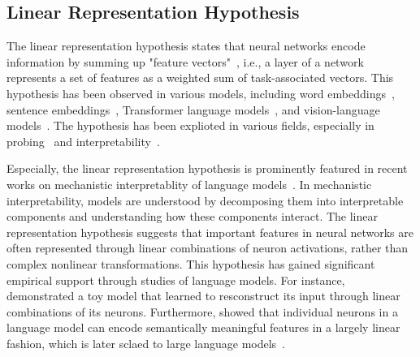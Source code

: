 \subsection{Linear Representation Hypothesis}
The linear representation hypothesis states that neural networks encode information by summing up "feature vectors"~\citep{mikolov2013linguistic,arora2016latent,olah2020zoom}, i.e., a layer of a network represents a set of features as a weighted sum of 
task-associated vectors.
This hypothesis has been observed in various models, including word embeddings~\citep{mikolov2013linguistic,conneau2017word}, sentence embeddings~\citep{bowman2015generating}, Transformer language models~\citep{meng2022locating,hendel2023context}, and vision-language models~\citep{trager2023linear,perera2023prompt}.
The hypothesis has been explioted in various fields, especially in probing~\citep{alain2018understanding, belinkov2022probing} and interpretability~\citep{nostalgebraist2020logitlens,elhage2022toy,bricken2023monosemanticity,gao2024scaling}.

Especially, the linear representation hypothesis is prominently featured in recent works on mechanistic interpretablity of language models~\citep{olsson2022context,elhage2022toy,bricken2023monosemanticity,templeton2024scaling}. In mechanistic interpretability, models are understood by decomposing them into interpretable components and understanding how these components interact. The linear representation hypothesis suggests that important features in neural networks are often represented through linear combinations of neuron activations, rather than complex nonlinear transformations.
This hypothesis has gained significant empirical support through studies of language models. For instance, \citep{elhage2022toy} demonstrated a toy model that learned to resconstruct its input through linear combinations of its neurons. Furthermore, \citet{bricken2023monosemanticity} showed that individual neurons in a language model can encode semantically meaningful features in a largely linear fashion, which is later sclaed to large language models~\citep{templeton2024scaling}.